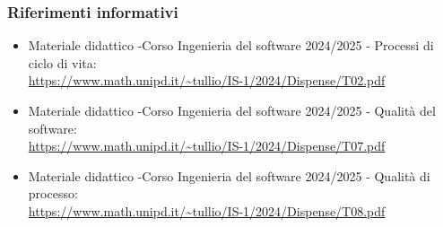         \subsubsection{Riferimenti informativi}
        \begin{itemize}
            \item Materiale didattico -Corso Ingenieria del software 2024/2025 - Processi di ciclo di vita: \\ \url{https://www.math.unipd.it/~tullio/IS-1/2024/Dispense/T02.pdf}
            \item Materiale didattico -Corso Ingenieria del software 2024/2025 - Qualità del software: \\ \url{https://www.math.unipd.it/~tullio/IS-1/2024/Dispense/T07.pdf}
            \item Materiale didattico -Corso Ingenieria del software 2024/2025 - Qualità di processo: \\ \url{https://www.math.unipd.it/~tullio/IS-1/2024/Dispense/T08.pdf}
        \end{itemize}